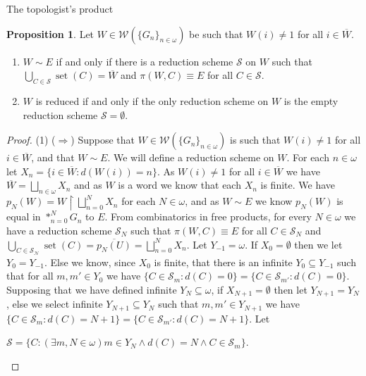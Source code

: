 \documentclass{amsart}
\theoremstyle{definition}\newtheorem{theorem}{Theorem}
\theoremstyle{definition}\newtheorem*{A}{Main Theorem}
\theoremstyle{definition}\newtheorem*{B}{Theorem \ref{elementaryequiv}}
\theoremstyle{definition}\newtheorem*{C}{Theorem \ref{continuous}}
\theoremstyle{definition}\newtheorem*{D}{Theorem \ref{bigisomorphism2}}
\theoremstyle{definition}\newtheorem{bigtheorem}{Main Theorem}
\numberwithin{theorem}{section}
\theoremstyle{definition}\newtheorem{corollary}[theorem]{Corollary}
\theoremstyle{definition}\newtheorem{proposition}[theorem]{Proposition}
\theoremstyle{definition}\newtheorem{definition}[theorem]{Definition}
\theoremstyle{definition}\newtheorem{question}[theorem]{Question}
\theoremstyle{definition}\newtheorem{example}[theorem]{Example}
\theoremstyle{definition}\newtheorem{remark}[theorem]{Remark}
\theoremstyle{definition}\newtheorem{note}[theorem]{Note}
\theoremstyle{definition}\newtheorem{lemma}[theorem]{Lemma}
\theoremstyle{definition}\newtheorem{fact}[theorem]{Fact}
\theoremstyle{definition}\newtheorem{define}[theorem]{Definition}
\theoremstyle{definition}\newtheorem{claim}[theorem]{Claim}
\theoremstyle{definition}\newtheorem{obs}[theorem]{Observation}
\theoremstyle{definition}\newtheorem{definitions}[theorem]{Definitions}
\newcommand{\set}{\operatorname{set}}
\newcommand{\W}{\mathcal{W}}
\begin{document}
\begin{section}{The topologist's product}
\begin{proposition}\label{reductionscheme}  Let $W \in \W(\{G_n\}_{n \in \omega})$ be such that $W(i) \neq 1$ for all $i \in \overline{W}$.

\begin{enumerate}

\item $W \sim E$ if and only if there is a reduction scheme $\mathcal{S}$ on $W$ such that $\bigcup_{C \in \mathcal{S}} \set(C) = \overline{W}$ and $\pi(W, C) \equiv E$ for all $C \in \mathcal{S}$.

\item $W$ is reduced if and only if the only reduction scheme on $W$ is the empty reduction scheme $\mathcal{S} = \emptyset$.

\end{enumerate}

\end{proposition}

\begin{proof} (1) ($\Rightarrow$)  Suppose that $W \in \W(\{G_n\}_{n \in \omega})$ is such that $W(i) \neq 1$ for all $i \in \overline{W}$, and that $W \sim E$.  We will define a reduction scheme on $W$.  For each $n \in \omega$ let $X_n = \{i \in \overline{W}: d(W(i)) = n\}$.  As $W(i) \neq 1$ for all $i \in \overline{W}$ we have $\overline{W} = \bigsqcup_{n \in \omega} X_n$ and as $W$ is a word we know that each $X_n$ is finite.  We have $p_N(W) = W \upharpoonright \bigsqcup_{n = 0}^N X_n$ for each $N \in \omega$, and as $W \sim E$ we know $p_N(W)$ is equal in $*_{n = 0}^N G_n$ to $E$.  From combinatorics in free products, for every $N \in \omega$ we have a reduction scheme $\mathcal{S}_N$ such that $\pi(W, C) \equiv E$ for all $C \in \mathcal{S}_N$ and $\bigcup_{C \in \mathcal{S_N}}\set(C) = \overline{p_N(U)} = \bigsqcup_{n = 0}^N X_n$.  Let $Y_{-1} = \omega$.  If $X_0 = \emptyset$ then we let $Y_0 = Y_{-1}$.  Else we know, since $X_0$ is finite, that there is an infinite $Y_0 \subseteq Y_{-1}$ such that for all $m, m' \in Y_0$ we have $\{C \in \mathcal{S}_m: d(C) = 0\} = \{C \in \mathcal{S}_{m'}: d(C) = 0\}$.  Supposing that we have defined infinite $Y_N \subseteq \omega$, if $X_{N+1} = \emptyset$ then let $Y_{N+1} = Y_N$, else we select infinite $Y_{N+1} \subseteq Y_N$ such that $m, m' \in Y_{N+1}$ we have $\{C \in \mathcal{S}_m: d(C) = N+1\} = \{C \in \mathcal{S}_{m'}: d(C) = N+1\}$.  Let

\begin{center}

$\mathcal{S} = \{C: (\exists m, N \in \omega)m \in Y_N \wedge d(C) = N \wedge C \in \mathcal{S}_{m}\}$.


\end{center}
\end{proof}
\end{section}
\end{document}
